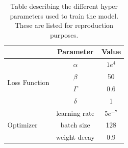 \begin{table}[]
\centering
\begin{tabular}{lcc}
\toprule
 & Parameter & Value \\
\toprule
\multirow{4}{*}{Loss Function} & $\alpha$ & $1e^4$ \\
                               & $\beta$ & 50 \\
                               & $\Gamma$ & 0.6 \\
                               & $\delta$ & 1 \\
\midrule
\multirow{3}{*}{Optimizer} & learning rate  & $5e^{-7}$ \\
                           & batch size     & 128 \\
                           & weight decay   & 0.9 \\
\bottomrule
\end{tabular}
\caption{Table describing the different hyper parameters used to train the model. These are listed for reproduction purposes.}
\label{tab:hyper_param}
\end{table}
